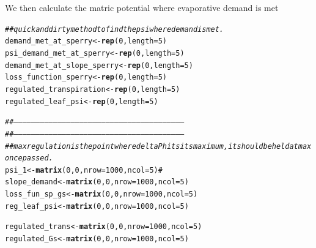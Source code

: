 \documentclass[a4paper]{article}\usepackage[]{graphicx}\usepackage[]{color}
\makeatletter
\newcommand{\hlnum}[1]{\textcolor[rgb]{0.686,0.059,0.569}{#1}}%
\newcommand{\hlcom}[1]{\textcolor[rgb]{0.678,0.584,0.686}{\textit{#1}}}%
\newcommand{\hlstd}[1]{\textcolor[rgb]{0.345,0.345,0.345}{#1}}%
\newcommand{\hlkwb}[1]{\textcolor[rgb]{0.69,0.353,0.396}{#1}}%
\newcommand{\hlkwc}[1]{\textcolor[rgb]{0.333,0.667,0.333}{#1}}%
\newcommand{\hlkwd}[1]{\textcolor[rgb]{0.737,0.353,0.396}{\textbf{#1}}}%
\newenvironment{kframe}{%
 \def\at@end@of@kframe{}%
 \ifinner\ifhmode%
  \def\at@end@of@kframe{\end{minipage}}%
  \begin{minipage}{\columnwidth}%
 \fi\fi%
 \def\FrameCommand##1{\hskip\@totalleftmargin \hskip-\fboxsep
 \colorbox{shadecolor}{##1}\hskip-\fboxsep
     \hskip-\linewidth \hskip-\@totalleftmargin \hskip\columnwidth}%
 \MakeFramed {\advance\hsize-\width
   \@totalleftmargin\z@ \linewidth\hsize
   \@setminipage}}%
 {\par\unskip\endMakeFramed%
 \at@end@of@kframe}
\newenvironment{knitrout}{}{} %
\makeatother
\begin{document}
We then calculate the matric potential where evaporative demand is met
\begin{knitrout}
\color{fgcolor}\begin{kframe}
\begin{alltt}
\hlcom{## quick and dirty method to find the psi where demand is met. }
\hlstd{demand_met_at_sperry} \hlkwb{<-} \hlkwd{rep}\hlstd{(}\hlnum{0}\hlstd{,} \hlkwc{length}\hlstd{=}\hlnum{5}\hlstd{)}
\hlstd{psi_demand_met_at_sperry} \hlkwb{<-} \hlkwd{rep}\hlstd{(}\hlnum{0}\hlstd{,} \hlkwc{length}\hlstd{=}\hlnum{5}\hlstd{)}
\hlstd{demand_met_at_slope_sperry} \hlkwb{<-} \hlkwd{rep}\hlstd{(}\hlnum{0}\hlstd{,} \hlkwc{length}\hlstd{=}\hlnum{5}\hlstd{)}
\hlstd{loss_function_sperry} \hlkwb{<-} \hlkwd{rep}\hlstd{(}\hlnum{0}\hlstd{,} \hlkwc{length}\hlstd{=}\hlnum{5}\hlstd{)}
\hlstd{regulated_transpiration} \hlkwb{<-} \hlkwd{rep}\hlstd{(}\hlnum{0}\hlstd{,} \hlkwc{length}\hlstd{=}\hlnum{5}\hlstd{)}
\hlstd{regulated_leaf_psi} \hlkwb{<-} \hlkwd{rep}\hlstd{(}\hlnum{0}\hlstd{,} \hlkwc{length}\hlstd{=}\hlnum{5}\hlstd{)}

\hlcom{##---------------------------------------------------------------------------------------------------------------------}
\hlcom{##---------------------------------------------------------------------------------------------------------------------}
\hlcom{## max regulation is the point where delta P hits its maximum, it should be held at max once passed.}
\hlstd{psi_1} \hlkwb{<-} \hlkwd{matrix}\hlstd{(}\hlnum{0}\hlstd{,}\hlnum{0}\hlstd{,}\hlkwc{nrow}\hlstd{=}\hlnum{1000}\hlstd{,} \hlkwc{ncol}\hlstd{=}\hlnum{5}\hlstd{)}\hlcom{#}
\hlstd{slope_demand} \hlkwb{<-} \hlkwd{matrix}\hlstd{(}\hlnum{0}\hlstd{,}\hlnum{0}\hlstd{,}\hlkwc{nrow}\hlstd{=}\hlnum{1000}\hlstd{,} \hlkwc{ncol}\hlstd{=}\hlnum{5}\hlstd{)}
\hlstd{loss_fun_sp_gs} \hlkwb{<-} \hlkwd{matrix}\hlstd{(}\hlnum{0}\hlstd{,}\hlnum{0}\hlstd{,}\hlkwc{nrow}\hlstd{=}\hlnum{1000}\hlstd{,} \hlkwc{ncol}\hlstd{=}\hlnum{5}\hlstd{)}
\hlstd{reg_leaf_psi} \hlkwb{<-} \hlkwd{matrix}\hlstd{(}\hlnum{0}\hlstd{,}\hlnum{0}\hlstd{,}\hlkwc{nrow}\hlstd{=}\hlnum{1000}\hlstd{,} \hlkwc{ncol}\hlstd{=}\hlnum{5}\hlstd{)}

\hlstd{regulated_trans} \hlkwb{<-} \hlkwd{matrix}\hlstd{(}\hlnum{0}\hlstd{,}\hlnum{0}\hlstd{,}\hlkwc{nrow}\hlstd{=}\hlnum{1000}\hlstd{,} \hlkwc{ncol}\hlstd{=}\hlnum{5}\hlstd{)}
\hlstd{regulated_Gs} \hlkwb{<-} \hlkwd{matrix}\hlstd{(}\hlnum{0}\hlstd{,}\hlnum{0}\hlstd{,}\hlkwc{nrow}\hlstd{=}\hlnum{1000}\hlstd{,} \hlkwc{ncol}\hlstd{=}\hlnum{5}\hlstd{)}


\end{alltt}
\end{kframe}
\end{knitrout}
\end{document}
